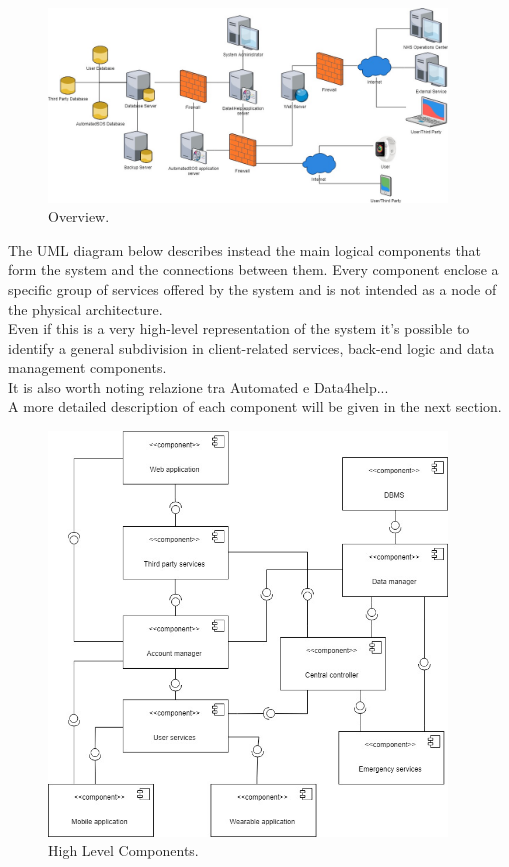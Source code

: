 \begin{figure}[ht]
    \centering
    \includegraphics[width=300pt]{images/Overview.jpg}
    \caption{Overview.}
\end{figure}

\clearpage
The UML diagram below describes instead the main logical components that form the system and the connections between them.
Every component enclose a specific group of services offered by the system and is not intended as a node of the physical architecture. \\
Even if this is a very high-level representation of the system it's possible to identify a general subdivision in client-related services, back-end logic and data management components. \\
It is also worth noting relazione tra Automated e Data4help...\\
A more detailed description of each component will be given in the next section. \\

\begin{figure}[ht]
    \centering
    \includegraphics[width=300pt]{images/High-Level_Components.jpg}
    \caption{High Level Components.}
\end{figure}
\clearpage

